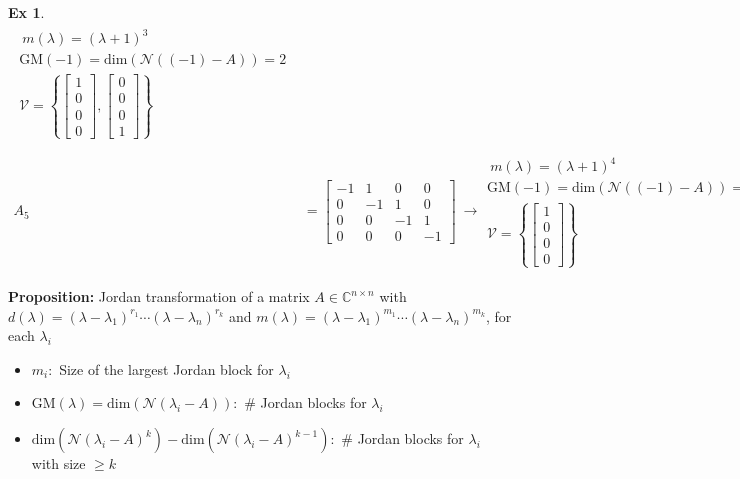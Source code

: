 \documentclass[twoside]{article}
\newtheorem{exmp}[theorem]{Ex}
\begin{document}
\begin{exmp}
\begin{align*}
\begin{array}{c} \ m(\lambda) = (\lambda + 1)^3 \\ \mathrm{GM}(-1) = \mathrm{dim}\left( \mathcal{N}((-1) - A) \right) = 2 
\\
\mathcal{V} = \left\lbrace  \left[ \begin{array}{c} 1 \\ 0 \\ 0 \\ 0  \end{array} \right] ,   \left[ \begin{array}{c} 0  \\ 0 \\ 0 \\ 1 \end{array} \right]  \right\rbrace 
\end{array}
\\
\\
A_5 &=   \left[ \begin{array}{cccc} -1 & 1 & 0 & 0  \\ 0 & -1 & 1 & 0 \\ 0 & 0 & -1 & 1 \\ 0 & 0 & 0 & -1 \end{array} \right] \ \rightarrow  
\begin{array}{c} \ m(\lambda) = (\lambda + 1)^4 \\ \mathrm{GM}(-1) = \mathrm{dim}\left( \mathcal{N}((-1) - A) \right) = 1
\\
\mathcal{V} = \left\lbrace  \left[ \begin{array}{c} 1 \\ 0 \\ 0 \\ 0  \end{array} \right]   \right\rbrace 
\end{array}
\end{align*}
\end{exmp}


\textbf{Proposition:} Jordan transformation of a matrix $A \in \mathbb{C}^{n \times n}$ with 
$d(\lambda) = (\lambda - \lambda_1)^{r_1} \cdots (\lambda - \lambda_n)^{r_k} $ and
$m(\lambda) = (\lambda - \lambda_1)^{m_1} \cdots (\lambda - \lambda_n)^{m_k} $, for each $\lambda_i$
%
\begin{itemize}
	\item $m_i :$ Size of the largest Jordan block for $\lambda_i$
	\item $\mathrm{GM}(\lambda) = \mathrm{dim}\left( \mathcal{N}(\lambda_i - A) \right) : $ \# Jordan blocks for $\lambda_i$
	\item $\mathrm{dim}\left( \mathcal{N}(\lambda_i - A)^k \right) - \mathrm{dim}\left( \mathcal{N}(\lambda_i - A)^{k-1} \right) : $ \# Jordan blocks for $\lambda_i$ with size $\geq k$
\end{itemize}

\end{document}

